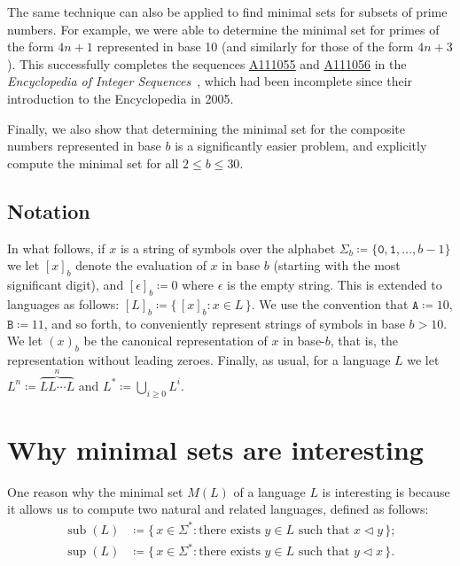 \documentclass[12pt]{article}
\def\subw{\mathrel{\triangleleft}}
\DeclareMathOperator\supe{sup}
\DeclareMathOperator\subb{sub}
\theoremstyle{plain}
\theoremstyle{definition}
\newcommand{\0}{\mathtt{0}}
\newcommand{\1}{\mathtt{1}}
\newcommand{\2}{\mathtt{2}}
\newcommand{\3}{\mathtt{3}}
\newcommand{\4}{\mathtt{4}}
\newcommand{\5}{\mathtt{5}}
\newcommand{\6}{\mathtt{6}}
\newcommand{\7}{\mathtt{7}}
\newcommand{\8}{\mathtt{8}}
\newcommand{\9}{\mathtt{9}}
\newcommand{\A}{\mathtt{A}}
\newcommand{\B}{\mathtt{B}}
\newcommand{\set}[2]{\{\,#1{}:{}#2\,\}}
\newcommand{\seqnum}[1]{\href{http://oeis.org/#1}{\underline{#1}}}
\newcommand{\updated}[1]{{\color{red}#1}}
\renewcommand{\updated}[1]{#1}
\begin{document}
The same technique can also be applied to find minimal sets for subsets of prime numbers.
For example, we were able to determine the minimal set for primes of the form $4n+1$
represented in base 10 (and similarly for those of the form $4n+3$).
This successfully completes the sequences 
\seqnum{A111055} and \seqnum{A111056} in the 
\textit{Encyclopedia of Integer Sequences}~\cite{oeis},
which had been incomplete
since their introduction to the Encyclopedia in 2005.

Finally, we also show that determining the minimal set for
the composite numbers represented in base $b$ is a significantly easier problem,
and explicitly compute the minimal set for all $2\leq b\leq 30$.

\subsection{Notation}

In what follows, if $x$ is a string of symbols over the alphabet
$\Sigma_b \coloneqq \lbrace \0, \1, \dotsc, b-1 \rbrace$ we let 
$[x]_b$ denote the evaluation of $x$ in base $b$ (starting with the
most significant digit)\updated{, and $[\epsilon]_b\coloneqq0$ where $\epsilon$
is the empty string}.  This is extended to languages as follows:
$[L]_b \coloneqq \set{ [x]_b }{ x \in L }$.
We use the convention that $\A \coloneqq 10$, $\B \coloneqq 11$, and so forth,
to conveniently represent strings of symbols in base $b > 10$.
We let $(x)_b$ be the canonical representation
of $x$ in base-$b$, that is, the representation without leading zeroes.
Finally, as usual, for a language $L$ we let
$L^n \coloneqq \overbrace{LL\dotsm L}^n$ and $L^* \coloneqq \bigcup_{i \geq 0} L^i$.

\section{Why minimal sets are interesting}

One reason why
the minimal set $M(L)$ of a language $L$ is interesting is because it
allows us to compute two natural and related languages,
defined as follows:
\begin{align*}
\subb(L) &\coloneqq \set{x \in \Sigma^*}{\text{there exists $y \in L$ such that $x \subw y$}} ; \\
\supe(L) &\coloneqq \set{x \in \Sigma^*}{\text{there exists $y \in L$ such that $y \subw x$}} .
\end{align*}
\end{document}

